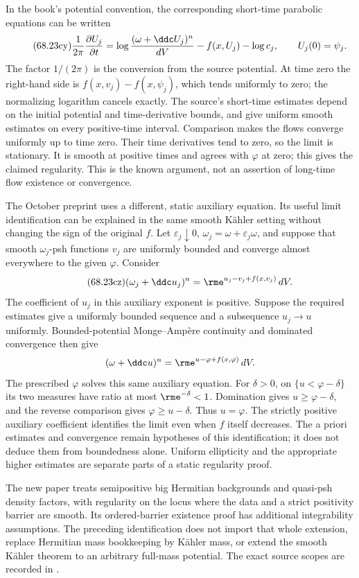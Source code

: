 In the book's potential convention, the corresponding short-time
parabolic equations can be written
\[
\tag{68.23cy}\label{eq:ytd-smooth-bounded-flow}
 \frac1{2\pi}\frac{\partial U_j}{\partial t}
    =\log\frac{(\omega+\ddc U_j)^n}{dV}
                    -f(x,U_j)-\log c_j,
 \qquad U_j(0)=\psi_j.
\]
The factor $1/(2\pi)$ is the conversion from the source potential.
At time zero the right-hand side is
$f(x,v_j)-f(x,\psi_j)$, which tends uniformly to zero; the
normalizing logarithm cancels exactly. The source's short-time
estimates depend on the initial potential and time-derivative bounds,
and give uniform smooth estimates on every positive-time interval.
Comparison makes the flows converge uniformly up to time zero.
Their time derivatives tend to zero, so the limit is stationary.
It is smooth at positive times and agrees with $\varphi$ at zero;
this gives the claimed regularity. This is the known argument,
not an assertion of long-time flow existence or convergence.

The October preprint \cite{BadianeLuZeriahi26RegularityV1} uses a
different, static auxiliary equation. Its useful limit identification
can be explained in the same smooth K\"ahler setting without changing
the sign of the original $f$. Let $\varepsilon_j\downarrow0$,
$\omega_j=\omega+\varepsilon_j\omega$, and suppose that smooth
$\omega_j$-psh functions $v_j$ are uniformly bounded and converge
almost everywhere to the given $\varphi$. Consider
\[
\tag{68.23cz}\label{eq:ytd-smooth-bounded-frozen-equation}
 (\omega_j+\ddc u_j)^n
        =\rme^{u_j-v_j+f(x,v_j)}\,dV.
\]
The coefficient of $u_j$ in this auxiliary exponent is positive.
Suppose the required estimates give a uniformly bounded sequence
and a subsequence $u_j\to u$ uniformly. Bounded-potential
Monge--Amp\`ere continuity and dominated convergence then give
\[
 (\omega+\ddc u)^n
       =\rme^{u-\varphi+f(x,\varphi)}\,dV.
\]
The prescribed $\varphi$ solves this same auxiliary equation.
For $\delta>0$, on $\{u<\varphi-\delta\}$ its two measures
have ratio at most $\rme^{-\delta}<1$. Domination gives
$u\geq\varphi-\delta$, and the reverse comparison gives
$\varphi\geq u-\delta$. Thus $u=\varphi$.
The strictly positive auxiliary coefficient identifies the limit
even when $f$ itself decreases. The a priori estimates and
convergence remain hypotheses of this identification; it does not
deduce them from boundedness alone. Uniform ellipticity and the
appropriate higher estimates are separate parts of a static
regularity proof.

The new paper treats semipositive big Hermitian backgrounds and
quasi-psh density factors, with regularity on the locus where the
data and a strict positivity barrier are smooth. Its ordered-barrier
existence proof has additional integrability assumptions.
The preceding identification does not import that whole extension,
replace Hermitian mass bookkeeping by K\"ahler mass, or extend the
smooth K\"ahler theorem to an arbitrary full-mass potential.
The exact source scopes are recorded in
.

